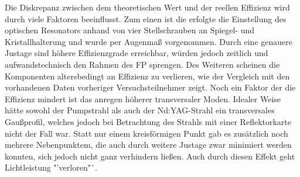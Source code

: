 \documentclass[twoside,colorback,accentcolor=tud4c,11pt]{tudreport}
\begin{document}
Die Diskrepanz zwischen dem theoretischen Wert und der reellen Effizienz wird durch viele Faktoren beeinflusst. Zum einen ist die erfolgte die Einstellung des optischen Resonators anhand von vier Stellschrauben an Spiegel- und Kristallhalterung und wurde per Augenmaß vorgenommen. Durch eine genauere Justage sind höhere Effizienzgrade erreichbar, würden jedoch zeitlich und aufwandstechnisch den Rahmen des FP sprengen. Des Weiteren scheinen die Komponenten altersbedingt an Effizienz zu verlieren, wie der Vergleich mit den vorhandenen Daten vorheriger Versuchsteilnehmer zeigt. Noch ein Faktor der die Effizienz mindert ist das anregen höherer transversaler Moden. Idealer Weise hätte sowohl der Pumpstrahl als auch der Nd:YAG-Strahl ein transversales Gaußprofil, welches jedoch bei Betrachtung des Strahls mit einer Reflektorkarte nicht der Fall war. Statt nur einem kreisförmigen Punkt gab es zusätzlich noch mehrere Nebenpunktem, die auch durch weitere Justage zwar minimiert werden konnten, sich jedoch nicht ganz verhindern ließen. Auch durch diesen Effekt geht Lichtleistung "'verloren"`.
\end{document}
